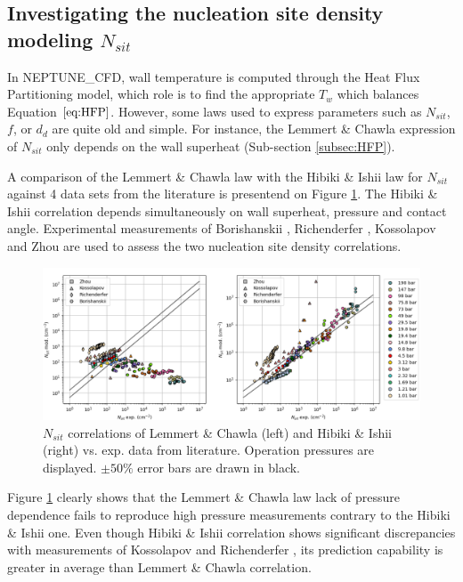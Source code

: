 \subsection{Investigating the nucleation site density modeling $N_{sit}$}

In NEPTUNE\_CFD, wall temperature is computed through the Heat Flux Partitioning model, which role is to find the appropriate $T_{w}$ which balances Equation $\ref{eq:HFP}$. However, some laws used to express parameters such as $N_{sit}$, $f$, or $d_{d}$ are quite old and simple. For instance, the {Lemmert} \& {Chawla}\cite{Lemmert1977} expression of $N_{sit}$ only depends on the wall superheat (Sub-section \ref{subsec:HFP}).%

A comparison of the {Lemmert} \& {Chawla} law\cite{Lemmert1977} with  the {Hibiki} \& {Ishii}\cite{Hibiki2003} law for $N_{sit}$ against 4 data sets from the literature is presentend on Figure \ref{fig:nsit}. The {Hibiki} \& {Ishii} correlation depends simultaneously on wall superheat, pressure and contact angle.  Experimental measurements of {Borishanskii} \etal\cite{Borishanskii1961}, {Richenderfer} \etal\cite{Richenderfer2018}, {Kossolapov} \etal\cite{Kossolapov2020} and {Zhou} \etal\cite{Zhou2020} are used to assess the two nucleation site density correlations.
%
\begin{figure}[h!]
\centering
\includegraphics[scale=0.45]{img/DEBORA/nsit.png}
\caption{$N_{sit}$ correlations of {Lemmert} \& {Chawla} (left) and {Hibiki} \& {Ishii} (right) vs. exp. data from literature. Operation pressures are displayed. $\pm 50\%$ error bars are drawn in black.}
\label{fig:nsit}
\end{figure}
%

Figure \ref{fig:nsit} clearly shows that the {Lemmert} \& {Chawla} law lack of pressure dependence fails to reproduce high pressure measurements contrary to the {Hibiki} \& {Ishii} one. Even though {Hibiki} \& {Ishii} correlation shows significant discrepancies with measurements of {Kossolapov} \etal and {Richenderfer} \etal, its prediction capability is greater in average than {Lemmert} \& {Chawla} correlation.


